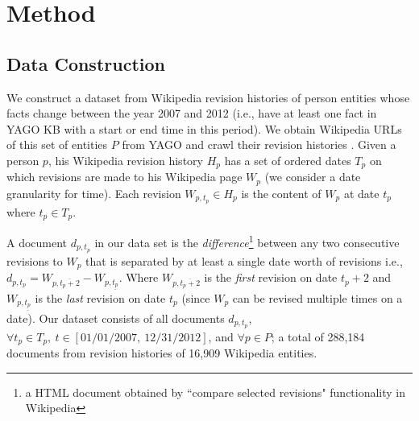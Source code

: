 \section{Method} \label{sec:method}

\subsection{Data Construction}
We construct a dataset from Wikipedia revision histories of person entities whose facts change between the year 2007 and 2012 (i.e., have at least one fact in YAGO KB with a start or end time in this period). We obtain Wikipedia URLs of this set of entities $P$ from YAGO and crawl their revision histories%
. Given a person $p$, his Wikipedia revision history $H_p$ has a set of ordered dates $T_p$ on which revisions are made to his Wikipedia page $W_p$ (we consider a date granularity for time). Each revision $W_{p, t_p} \in H_p$ is the content of $W_p$ at date $t_p$ where $t_p \in T_p$. 

A document $d_{p, t_p}$ in our data set is the \textit{difference}\footnote[2]{a HTML document obtained by ``compare selected revisions"  functionality in Wikipedia} between any two consecutive revisions to $W_p$ that is separated by at least a single date worth of revisions i.e., $d_{p, t_p} = W_{p, \overline{t_p+2}} - W_{p, \underline{t_p}}$. Where $W_{p, \overline{t_p+2}}$ is the \textit{first} revision on date $t_p+2$ and $W_{p, \underline{t_p}}$ is the \textit{last} revision on date $t_p$ (since $W_p$ can be revised multiple times on a date). Our dataset consists of all documents $d_{p, t_p}$, $\forall t_p \in T_p,\ t \in [01/01/2007,\ 12/31/2012]$, and $\forall p \in P$; a total of 288,184 documents from revision histories of 16,909 Wikipedia entities.


